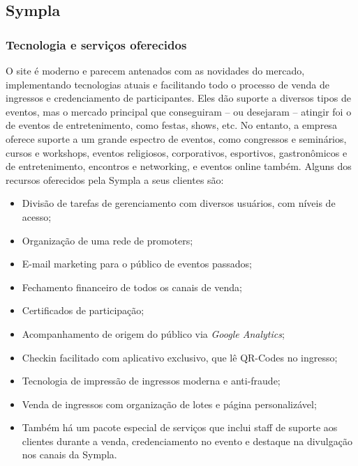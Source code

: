 \documentclass[a4paper]{abntex2}
\begin{document}
\subsection{Sympla}

\subsubsection*{Tecnologia e serviços oferecidos}
O site é moderno e parecem antenados com as novidades do mercado, implementando tecnologias atuais e facilitando todo o processo de venda de ingressos e credenciamento de participantes. Eles dão suporte a diversos tipos de eventos, mas o mercado principal que conseguiram -- ou desejaram -- atingir foi o de eventos de entretenimento, como festas, shows, etc. No entanto, a empresa oferece suporte a um grande espectro de eventos, como congressos e seminários, cursos e workshops, eventos religiosos, corporativos, esportivos, gastronômicos e de entretenimento, encontros e networking, e eventos online também. Alguns dos recursos oferecidos pela Sympla a seus clientes são\cite{sympla-features}:
\begin{itemize}[itemsep=-1ex]
	\item Divisão de tarefas de gerenciamento com diversos usuários, com níveis de acesso;
	\item Organização de uma rede de promoters;
	\item E-mail marketing para o público de eventos passados;
	\item Fechamento financeiro de todos os canais de venda;
	\item Certificados de participação;
	\item Acompanhamento de origem do público via \emph{Google Analytics};
	\item Checkin facilitado com aplicativo exclusivo, que lê QR-Codes no ingresso;
	\item Tecnologia de impressão de ingressos moderna e anti-fraude;
	\item Venda de ingressos com organização de lotes e página personalizável;
	\item Também há um pacote especial de serviços que inclui staff de suporte aos clientes durante a venda, credenciamento no evento e destaque na divulgação nos canais da Sympla.
\end{itemize}
\end{document}
